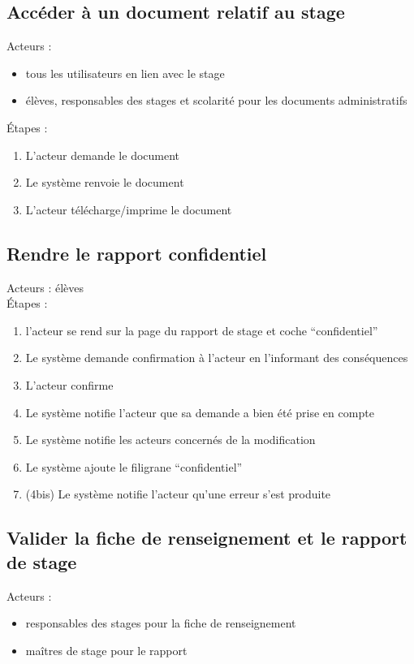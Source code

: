 \documentclass{scrreprt}
\begin{document}
\subsection{Acc\'eder \`a un document relatif au stage}
Acteurs :
\begin{itemize}
\item tous les utilisateurs en lien avec le stage
\item \'el\`eves, responsables des stages et scolarit\'e pour les documents administratifs
\end{itemize}
\'Etapes :
\begin{enumerate}
\item L’acteur demande le document
\item Le syst\`eme renvoie le document
\item L’acteur t\'el\'echarge/imprime le document
\end{enumerate}


\subsection{Rendre le rapport confidentiel}
Acteurs : élèves
\\
\'Etapes : 
\begin{enumerate}
\item l’acteur se rend sur la page du rapport de stage et coche “confidentiel”
\item Le système demande confirmation à l’acteur en l’informant des conséquences
\item L’acteur confirme 
\item Le système notifie l’acteur que sa demande a bien été prise en compte
\item Le système notifie les acteurs concernés de la modification
\item Le système ajoute le filigrane “confidentiel” 
\item (4bis) Le système notifie l’acteur qu’une erreur s’est produite 
\end{enumerate}


\subsection{Valider la fiche de renseignement et le rapport de stage}
Acteurs :
\begin{itemize}
\item responsables des stages pour la fiche de renseignement
\item maîtres de stage pour le rapport
\end{itemize}
\end{document}
